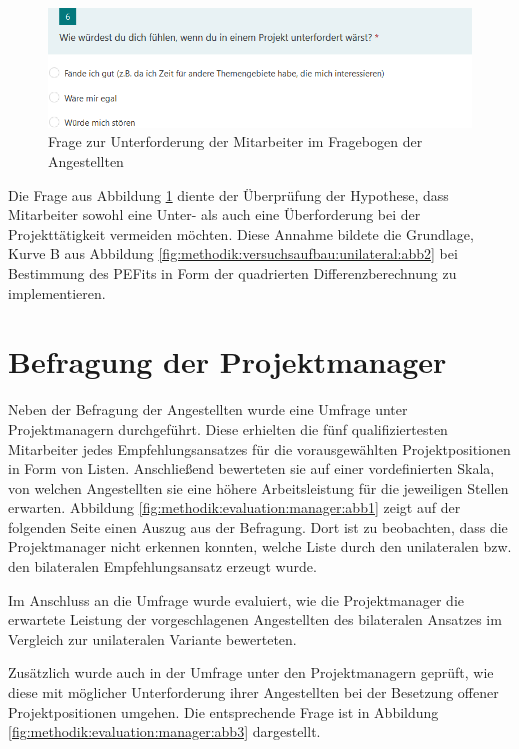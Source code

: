 \begin{figure}[h]
	\centering
	\includegraphics[width=1\textwidth]{gfx/umfrage-mitarbeiter-unterforderung.png}
	\caption{Frage zur Unterforderung der Mitarbeiter im Fragebogen der Angestellten}
	\label{fig:methodik:evaluation:abb3}
\end{figure}

Die Frage aus Abbildung \ref{fig:methodik:evaluation:abb3} diente der Überprüfung der Hypothese, dass Mitarbeiter sowohl eine Unter- als auch eine Überforderung bei der Projekttätigkeit vermeiden möchten. Diese Annahme bildete die Grundlage, Kurve B aus Abbildung \ref{fig:methodik:versuchsaufbau:unilateral:abb2} bei Bestimmung des \acp{PEFit} in Form der quadrierten Differenzberechnung zu implementieren.

\section{Befragung der Projektmanager}
\label{ch:methodik:evaluation:manager}
Neben der Befragung der Angestellten wurde eine Umfrage unter Projektmanagern durchgeführt. Diese erhielten die fünf qualifiziertesten Mitarbeiter jedes Empfehlungsansatzes für die vorausgewählten Projektpositionen in Form von Listen. Anschließend bewerteten sie auf einer vordefinierten Skala, von welchen Angestellten sie eine höhere Arbeitsleistung für die jeweiligen Stellen erwarten. Abbildung \ref{fig:methodik:evaluation:manager:abb1} zeigt auf der folgenden Seite einen Auszug aus der Befragung. Dort ist zu beobachten, dass die Projektmanager nicht erkennen konnten, welche Liste durch den unilateralen bzw. den bilateralen Empfehlungsansatz erzeugt wurde.

Im Anschluss an die Umfrage wurde evaluiert, wie die Projektmanager die erwartete Leistung der vorgeschlagenen Angestellten des bilateralen Ansatzes im Vergleich zur unilateralen Variante bewerteten.

Zusätzlich wurde auch in der Umfrage unter den Projektmanagern geprüft, wie diese mit möglicher Unterforderung ihrer Angestellten bei der Besetzung offener Projektpositionen umgehen. Die entsprechende Frage ist in Abbildung \ref{fig:methodik:evaluation:manager:abb3} dargestellt.

